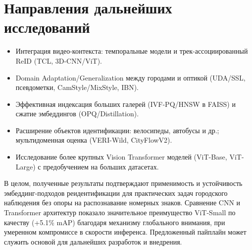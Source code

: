 \section*{Направления дальнейших исследований}
\begin{itemize}
  \item Интеграция видео-контекста: темпоральные модели и трек-ассоциированный ReID (TCL, 3D-CNN/ViT).
  \item Domain Adaptation/Generalization между городами и оптикой (UDA/SSL, псевдометки, CamStyle/MixStyle, IBN).
  \item Эффективная индексация больших галерей (IVF-PQ/HNSW в FAISS) и сжатие эмбеддингов (OPQ/Distillation).
  \item Расширение объектов идентификации: велосипеды, автобусы и др.; мультидоменная оценка (VERI-Wild, CityFlowV2).
  \item Исследование более крупных Vision Transformer моделей (ViT-Base, ViT-Large) с предобучением на больших датасетах.
\end{itemize}

В целом, полученные результаты подтверждают применимость и устойчивость эмбеддинг-подходов реидентификации для практических задач городского наблюдения без опоры на распознавание номерных знаков. Сравнение CNN и Transformer архитектур показало значительное преимущество ViT-Small по качеству (+5.1\% mAP) благодаря механизму глобального внимания, при умеренном компромиссе в скорости инференса. Предложенный пайплайн может служить основой для дальнейших разработок и внедрения.
